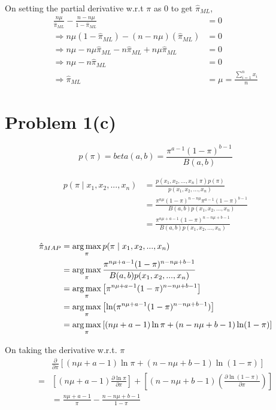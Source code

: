 \documentclass[openany,11pt]{homework}
\begin{document}
On setting the partial derivative w.r.t $\pi$ as 0 to get $\hat{\pi}_{ML}$,
\begin{align}
\frac{n\mu}{\hat{\pi}_{ML}} -\frac{n-n\mu}{1-\hat{\pi}_{ML}} & = 0 \\
\Rightarrow n\mu(1-\hat{\pi}_{ML}) - (n-n\mu)(\hat{\pi}_{ML}) & = 0 \\
\Rightarrow n\mu - n\mu\hat{\pi}_{ML} - n\hat{\pi}_{ML} + n\mu\hat{\pi}_{ML} & = 0 \\
\Rightarrow n\mu - n\hat{\pi}_{ML} & = 0 \\
\Rightarrow \hat{\pi}_{ML} & = \mu = \frac{\sum_{i=1}^{n} x_i}{n}
\end{align}

\section*{Problem 1(c)}

\[
p(\pi) = beta(a, b) = \frac{\pi^{a-1}(1-\pi)^{b-1}}{B(a, b)}
\]

\begin{align}
p(\pi \mid x_1, x_2, ..., x_n) & = \frac{p(x_1, x_2, ..., x_n \mid \pi)p(\pi)}{p(x_1, x_2, ..., x_n)} \\
							   & = \frac{\pi^{n\mu}(1-\pi)^{n-n\mu}\pi^{a-1}(1-\pi)^{b-1}}{B(a, b)p(x_1, x_2, ..., x_n)} \\
							   & = \frac{\pi^{n\mu+a-1}(1-\pi)^{n-n\mu+b-1}}{B(a, b)p(x_1, x_2, ..., x_n)}
\end{align}

\begin{align}
\hat{\pi}_{MAP} & = \operatornamewithlimits{arg\,max}_{\pi} p(\pi \mid x_1, x_2, ..., x_n) \\
& = \operatornamewithlimits{arg\,max}_{\pi} \frac{\pi^{n\mu+a-1}(1-\pi)^{n-n\mu+b-1}}{B(a, b)p(x_1, x_2, ..., x_n)} \\
& = \operatornamewithlimits{arg\,max}_{\pi} \left[\pi^{n\mu+a-1}(1-\pi)^{n-n\mu+b-1}\right] \\
& = \operatornamewithlimits{arg\,max}_{\pi} \left[\ln(\pi^{n\mu+a-1}(1-\pi)^{n-n\mu+b-1})\right]	\\
& = \operatornamewithlimits{arg\,max}_{\pi} \left[(n\mu+a-1)\ln\pi + (n-n\mu+b-1)\ln(1-\pi)\right] \\
\end{align}

On taking the derivative w.r.t. $\pi$
\begin{align}
& \frac{\partial }{\partial \pi} \left[(n\mu+a-1)\ln\pi + (n-n\mu+b-1)\ln(1-\pi)\right] \\
= & \left[(n\mu+a-1) \frac{\partial \ln \pi}{\partial \pi}\right] + \left[(n-n\mu+b-1)\left(\frac{\partial \ln(1-\pi)}{\partial \pi}\right)\right] \\
& = \frac{n\mu+a-1}{\pi} -\frac{n-n\mu+b-1}{1-\pi}
\end{align}
\end{document}
